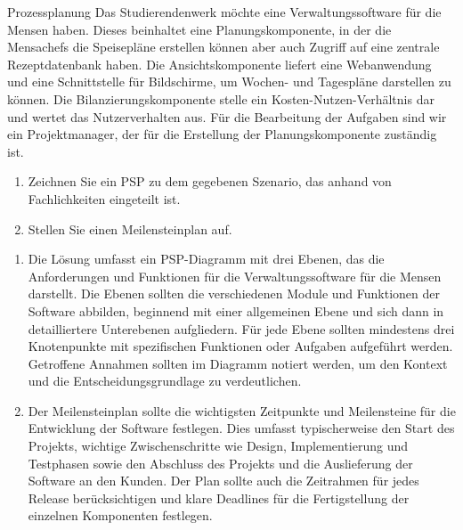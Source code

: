 \documentclass{article}
\begin{document}
\begin{exercise}{Prozessplanung}
  Das Studierendenwerk möchte eine Verwaltungssoftware für die Mensen haben. Dieses beinhaltet eine Planungskomponente, in der die Mensachefs die Speisepläne erstellen können aber auch Zugriff auf eine zentrale Rezeptdatenbank haben. Die Ansichtskomponente liefert eine Webanwendung und eine Schnittstelle für Bildschirme, um Wochen- und Tagespläne darstellen zu können. Die Bilanzierungskomponente stelle ein Kosten-Nutzen-Verhältnis dar und wertet das Nutzerverhalten aus. Für die Bearbeitung der Aufgaben sind wir ein Projektmanager, der für die Erstellung der Planungskomponente zuständig ist.


  \begin{enumerate}
    \item Zeichnen Sie ein PSP zu dem gegebenen Szenario, das anhand von Fachlichkeiten eingeteilt ist.
    \item Stellen Sie einen Meilensteinplan auf.
  \end{enumerate}

  \begin{solution}
    \begin{enumerate}
      \item Die Lösung umfasst ein PSP-Diagramm mit drei Ebenen, das die Anforderungen und Funktionen für die Verwaltungssoftware für die Mensen darstellt. Die Ebenen sollten die verschiedenen Module und Funktionen der Software abbilden, beginnend mit einer allgemeinen Ebene und sich dann in detailliertere Unterebenen aufgliedern. Für jede Ebene sollten mindestens drei Knotenpunkte mit spezifischen Funktionen oder Aufgaben aufgeführt werden. Getroffene Annahmen sollten im Diagramm notiert werden, um den Kontext und die Entscheidungsgrundlage zu verdeutlichen.
      \item Der Meilensteinplan sollte die wichtigsten Zeitpunkte und Meilensteine für die Entwicklung der Software festlegen. Dies umfasst typischerweise den Start des Projekts, wichtige Zwischenschritte wie Design, Implementierung und Testphasen sowie den Abschluss des Projekts und die Auslieferung der Software an den Kunden. Der Plan sollte auch die Zeitrahmen für jedes Release berücksichtigen und klare Deadlines für die Fertigstellung der einzelnen Komponenten festlegen.
    \end{enumerate}
  \end{solution}
\end{exercise}
\end{document}
